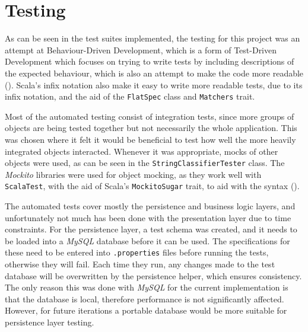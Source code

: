 \section{Testing} \label{sec:Testing}

As can be seen in the test suites implemented, the testing for this project was
an attempt at Behaviour-Driven Development, which is a form of Test-Driven
Development which focuses on trying to write tests by including descriptions of
the expected behaviour, which is also an attempt to make the code more readable
(\cite[][Ch.~1]{wynne2017cucumber}). Scala's infix notation also make it easy
to write more readable tests, due to its infix notation, and the aid of the
\texttt{FlatSpec} class and \texttt{Matchers} trait.

Most of the automated testing consist of integration tests, since more groups
of objects are being tested together but not necessarily the whole application.
This was chosen where it felt it would be beneficial to test how well the more
heavily integrated objects interacted. Whenever it was appropriate, mocks of
other objects were used, as can be seen in the \texttt{StringClassifierTester}
class. The \emph{Mockito} libraries were used for object mocking, as they work
well with \texttt{ScalaTest}, with the aid of Scala's \texttt{MockitoSugar}
trait, to aid with the syntax (\cite[][pp.~102-106]{hinojosa2013testing}).


The automated tests cover mostly the persistence and business logic layers, and
unfortunately not much has been done with the presentation layer due to time
constraints. For the persistence layer, a test schema was created, and it needs
to be loaded into a \emph{MySQL} database before it can be used. The
specifications for these need to be entered into \texttt{.properties} files
before running the tests, otherwise they will fail. Each time they run, any
changes made to the test database will be overwritten by the persistence
helper, which ensures consistency. The only reason this was done with
\emph{MySQL} for the current implementation is that the database is local,
therefore performance is not significantly affected. However, for future
iterations a portable database would be more suitable for persistence layer
testing.
